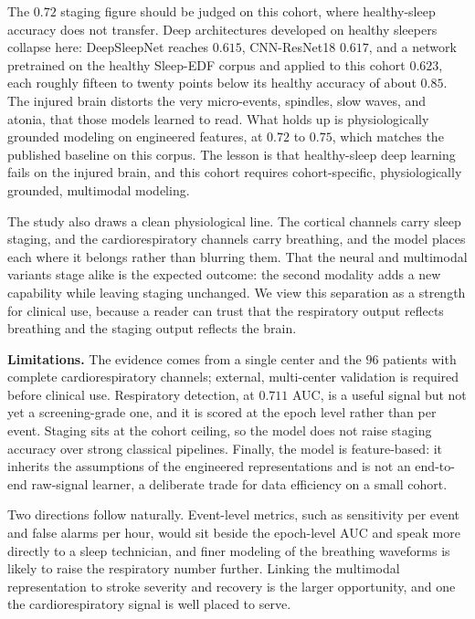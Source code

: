 \documentclass[preprint,12pt]{elsarticle}
\newcommand{\mmAuc}{0.711}
\begin{document}
The $0.72$ staging figure should be judged on this cohort, where healthy-sleep accuracy does not transfer. Deep
architectures developed on healthy sleepers collapse here: DeepSleepNet reaches $0.615$,
CNN-ResNet18 $0.617$, and a network pretrained on the healthy Sleep-EDF corpus and applied to
this cohort $0.623$, each roughly fifteen to twenty points below its healthy accuracy of about
$0.85$. The injured brain distorts the very micro-events, spindles, slow waves, and atonia, that
those models learned to read. What holds up is physiologically grounded modeling on engineered
features, at $0.72$ to $0.75$, which matches the published baseline on this corpus. The lesson is
that healthy-sleep deep learning fails on the injured brain, and this cohort requires
cohort-specific, physiologically grounded, multimodal modeling.

The study also draws a clean physiological line. The cortical channels carry sleep staging, and
the cardiorespiratory channels carry breathing, and the model places each where it belongs
rather than blurring them. That the neural and multimodal variants stage alike is the expected
outcome: the second modality adds a new capability while leaving staging unchanged. We view this separation as a strength for
clinical use, because a reader can trust that the respiratory output reflects breathing and the
staging output reflects the brain.

\textbf{Limitations.} The evidence comes from a single center and the $96$ patients with
complete cardiorespiratory channels; external, multi-center validation is required before
clinical use. Respiratory detection, at $\mmAuc$ AUC, is a useful signal but not yet a
screening-grade one, and it is scored at the epoch level rather than per event. Staging sits at
the cohort ceiling, so the model does not raise staging accuracy over strong classical
pipelines. Finally, the model is feature-based: it inherits the assumptions of the engineered
representations and is not an end-to-end raw-signal learner, a deliberate trade for data
efficiency on a small cohort.

Two directions follow naturally. Event-level metrics, such as sensitivity per event and false
alarms per hour, would sit beside the epoch-level AUC and speak more directly to a sleep
technician, and finer modeling of the breathing waveforms is likely to raise the respiratory
number further. Linking the multimodal representation to stroke severity and recovery is the
larger opportunity, and one the cardiorespiratory signal is well placed to serve.
\end{document}
